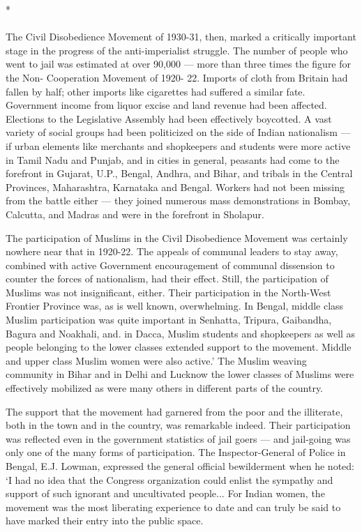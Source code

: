 \begin{center}*\end{center}

\paragraph*{}


The Civil Disobedience Movement of 1930-31, then, marked a critically important stage in the progress of the anti-imperialist struggle. The number of people who went to jail was estimated at over 90,000 — more than three times the figure for the Non- Cooperation Movement of 1920- 22. Imports of cloth from Britain had fallen by half; other imports like cigarettes had suffered a similar fate. Government income from liquor excise and land revenue had been affected. Elections to the Legislative Assembly had been effectively boycotted. A vast variety of social groups had been politicized on the side of Indian nationalism — if urban elements like merchants and shopkeepers and students were more active in Tamil Nadu and Punjab, and in cities in general, peasants had come to the forefront in Gujarat, U.P., Bengal, Andhra, and Bihar, and tribals in the Central Provinces, Maharashtra, Karnataka and Bengal. Workers had not been missing from the battle either — they joined numerous mass demonstrations in Bombay, Calcutta, and Madras and were in the forefront in Sholapur. 

The participation of Muslims in the Civil Disobedience Movement was certainly nowhere near that in 1920-22. The appeals of communal leaders to stay away, combined with active Government encouragement of communal dissension to counter the forces of nationalism, had their effect. Still, the participation of Muslims was not insignificant, either. Their participation in the North-West Frontier Province was, as is well known, overwhelming. In Bengal, middle class Muslim participation was quite important in Senhatta, Tripura, Gaibandha, Bagura and Noakhali, and. in Dacca, Muslim students and shopkeepers as well as people belonging to the lower classes extended support to the movement. Middle and upper class Muslim women were also active.' The Muslim weaving community in Bihar and in Delhi and Lucknow the lower classes of Muslims were effectively mobilized as were many others in different parts of the country. 

The support that the movement had garnered from the poor and the illiterate, both in the town and in the country, was remarkable indeed. Their participation was reflected even in the government statistics of jail goers — and jail-going was only one of the many forms of participation. The Inspector-General of Police in Bengal, E.J. Lowman, expressed the general official bewilderment when he noted: `I had no idea that the Congress organization could enlist the sympathy and support of such ignorant and uncultivated people... For Indian women, the movement was the most liberating experience to date and can truly be said to have marked their entry into the public space.
